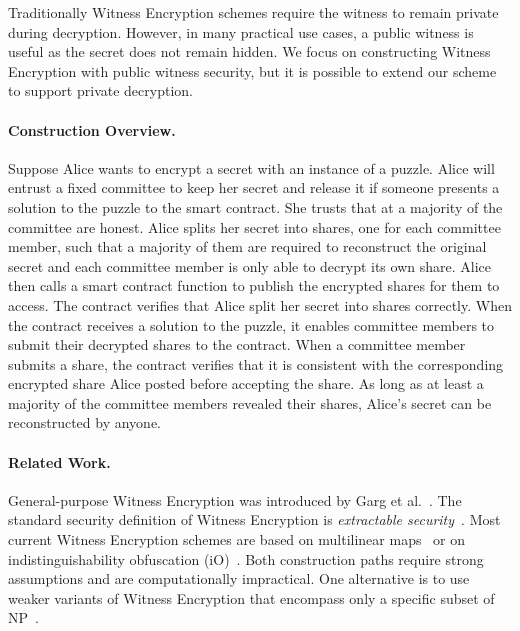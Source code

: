 Traditionally Witness Encryption schemes require the witness to remain private during decryption.
However, in many practical use cases, a public witness is useful as the secret does not remain hidden.
We focus on constructing Witness Encryption with public witness security, but it is possible to extend our scheme to support private decryption.

\paragraph{Construction Overview.}
Suppose Alice wants to encrypt a secret with an instance of a puzzle.
Alice will entrust a fixed committee to keep her secret and release it if someone presents a solution to the puzzle to the smart contract.
She trusts that at a majority of the committee are honest.
Alice splits her secret into shares, one for each committee member, such that a majority of them are required to reconstruct the original secret and each committee member is only able to decrypt its own share.
Alice then calls a smart contract function to publish the encrypted shares for them to access.
The contract verifies that Alice split her secret into shares correctly.
When the contract receives a solution to the puzzle, it enables committee members to submit their decrypted shares to the contract.
When a committee member submits a share, the contract verifies that it is consistent with the corresponding encrypted share Alice posted before accepting the share.
As long as at least a majority of the committee members revealed their shares, Alice's secret can be reconstructed by anyone.

\paragraph{Related Work.}
General-purpose Witness Encryption was introduced by Garg et al.~\cite{witness_encryption}.
The standard security definition of Witness Encryption is \emph{extractable security}~\cite{turing_machine_fe}.
Most current Witness Encryption schemes are based on multilinear maps~\cite{witness_encryption,we_multilinear_map} or on indistinguishability obfuscation (iO)~\cite{we_io}. Both construction paths require strong assumptions and are computationally impractical.
One alternative is to use weaker variants of Witness Encryption that encompass only a specific subset of \textsf{NP}~\cite{MrNISC}.

